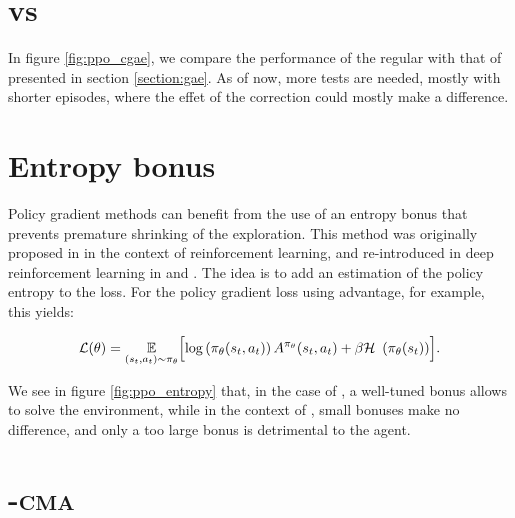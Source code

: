 \section{\gae vs \cgae}

In figure \ref{fig:ppo_cgae}, we compare the performance of the regular \gae with that of \cgae presented in section \ref{section:gae}. As of now, more tests are needed, mostly with shorter episodes, where the effet of the \cgae correction could mostly make a difference.



\section{Entropy bonus}

Policy gradient methods can benefit from the use of an entropy bonus that prevents premature shrinking of the exploration. This method was originally proposed in \cite{williams1991} in the context of reinforcement learning, and re-introduced in deep reinforcement learning in \cite{a2c} and \cite{ppo}. The idea is to add an estimation of the policy entropy to the loss. For the policy gradient loss using advantage, for example, this yields:

\begin{equation}
	\mathcal{L}(\theta) = \expect{(s_t, a_t) \sim \pi_\theta} \Bigl[ \log \left( \pi_\theta (s_t, a_t) \right) A^{\pi_\theta} (s_t, a_t) + \beta \entropy \left( \pi_\theta (s_t) \right) \Bigr].
\end{equation}

We see in figure \ref{fig:ppo_entropy} that, in the case of , a well-tuned bonus allows to solve the environment, while in the context of , small bonuses make no difference, and only a too large bonus is detrimental to the agent.



\section{\ppo-\textsc{cma}}

